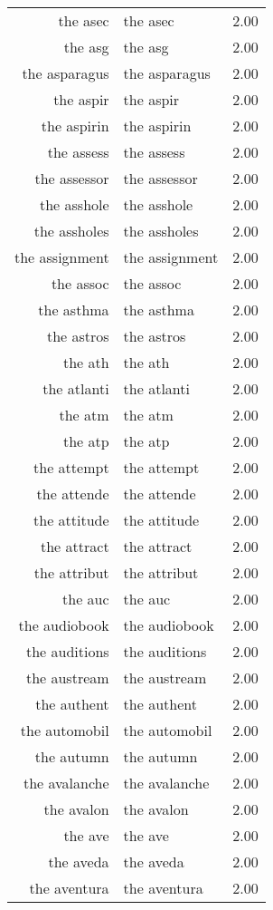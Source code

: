 \begin{table}[ht]
\begin{tabular}{rlr}
  the asec & the asec & 2.00 \\ 
  the asg & the asg & 2.00 \\ 
  the asparagus & the asparagus & 2.00 \\ 
  the aspir & the aspir & 2.00 \\ 
  the aspirin & the aspirin & 2.00 \\ 
  the assess & the assess & 2.00 \\ 
  the assessor & the assessor & 2.00 \\ 
  the asshole & the asshole & 2.00 \\ 
  the assholes & the assholes & 2.00 \\ 
  the assignment & the assignment & 2.00 \\ 
  the assoc & the assoc & 2.00 \\ 
  the asthma & the asthma & 2.00 \\ 
  the astros & the astros & 2.00 \\ 
  the ath & the ath & 2.00 \\ 
  the atlanti & the atlanti & 2.00 \\ 
  the atm & the atm & 2.00 \\ 
  the atp & the atp & 2.00 \\ 
  the attempt & the attempt & 2.00 \\ 
  the attende & the attende & 2.00 \\ 
  the attitude & the attitude & 2.00 \\ 
  the attract & the attract & 2.00 \\ 
  the attribut & the attribut & 2.00 \\ 
  the auc & the auc & 2.00 \\ 
  the audiobook & the audiobook & 2.00 \\ 
  the auditions & the auditions & 2.00 \\ 
  the austream & the austream & 2.00 \\ 
  the authent & the authent & 2.00 \\ 
  the automobil & the automobil & 2.00 \\ 
  the autumn & the autumn & 2.00 \\ 
  the avalanche & the avalanche & 2.00 \\ 
  the avalon & the avalon & 2.00 \\ 
  the ave & the ave & 2.00 \\ 
  the aveda & the aveda & 2.00 \\ 
  the aventura & the aventura & 2.00 \\ 

\end{tabular}
\end{table}
